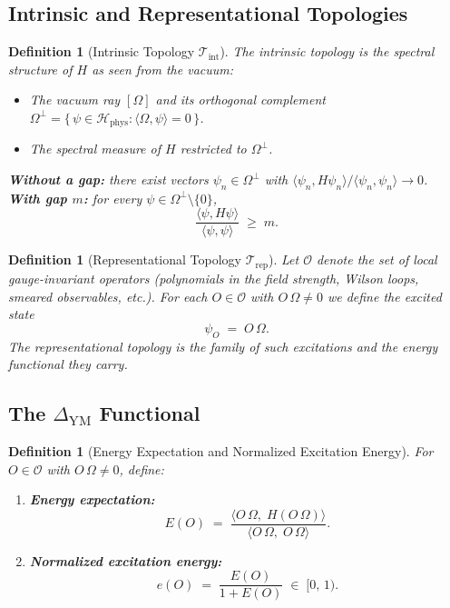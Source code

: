 \documentclass[11pt]{article}
\newtheorem{definition}[theorem]{Definition}
\begin{document}
\subsection{Intrinsic and Representational Topologies}

\begin{definition}[Intrinsic Topology $\mathcal{T}_{\mathrm{int}}$]
\label{def:T-int}
The \emph{intrinsic topology} is the spectral structure of $H$ as seen
from the vacuum:
\begin{itemize}
\item The vacuum ray $[\Omega]$ and its orthogonal complement
      $\Omega^{\perp}
       = \{\,\psi \in \mathcal{H}_{\mathrm{phys}} :
           \langle \Omega, \psi\rangle = 0\,\}$.
\item The spectral measure of $H$ restricted to $\Omega^{\perp}$.
\end{itemize}
\textbf{Without a gap:} there exist vectors
$\psi_n \in \Omega^{\perp}$ with
$\langle \psi_n, H\psi_n\rangle / \langle \psi_n, \psi_n\rangle
  \to 0$.\\[3pt]
\textbf{With gap $m$:} for every
$\psi \in \Omega^{\perp} \setminus \{0\}$,
\[
  \frac{\langle \psi, H\psi\rangle}{\langle \psi, \psi\rangle}
  \;\geq\; m .
\]
\end{definition}

\begin{definition}[Representational Topology $\mathcal{T}_{\mathrm{rep}}$]
\label{def:T-rep}
Let $\mathcal{O}$ denote the set of \emph{local gauge-invariant
operators} (polynomials in the field strength, Wilson loops, smeared
observables, etc.).  For each $O \in \mathcal{O}$ with
$O\,\Omega \neq 0$ we define the \emph{excited state}
\[
  \psi_O \;=\; O\,\Omega .
\]
The representational topology is the family of such excitations and the
energy functional they carry.
\end{definition}

\subsection{The $\Delta_{\mathrm{YM}}$ Functional}

\begin{definition}[Energy Expectation and Normalized Excitation Energy]
\label{def:energy-functionals}
For $O \in \mathcal{O}$ with $O\,\Omega \neq 0$, define:
\begin{enumerate}
\item \textbf{Energy expectation:}
      \[
        E(O)
        \;=\;
        \frac{\langle O\,\Omega,\; H(O\,\Omega)\rangle}
             {\langle O\,\Omega,\; O\,\Omega\rangle} .
      \]
\item \textbf{Normalized excitation energy:}
      \[
        e(O)
        \;=\;
        \frac{E(O)}{1 + E(O)}
        \;\in\; [0,\,1) .
      \]
\end{enumerate}
\end{definition}
\end{document}
